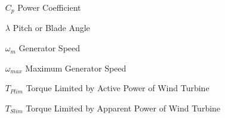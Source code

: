 
\begin{theglossary}{}
	
	\begin{itemize}[leftmargin=4.5em,align=parleft,labelsep=1cm]
		
		\item[$C_{p}$] 			Power Coefficient
		\item[$\lambda$] 		Pitch or Blade Angle
		\item[$\omega_{m}$] 	Generator Speed
		\item[$\omega_{max}$] 	Maximum Generator Speed
		\item[$T_{Plim}$]		Torque Limited by Active Power of Wind Turbine
		\item[$T_{Slim}$] 		Torque Limited by Apparent Power of Wind Turbine
		
	\end{itemize}
	
\end{theglossary}